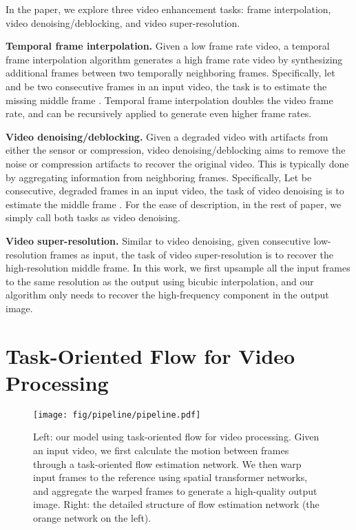 \documentclass[twocolumn,natbib]{svjour3}          \smartqed  \usepackage{graphicx}
\newcommand{\myparagraph}[1]{\vspace{5pt}\noindent\textbf{#1}}
\begin{document}
In the paper, we explore three video enhancement tasks: frame interpolation, video denoising/deblocking, and video super-resolution.

\myparagraph{Temporal frame interpolation. } Given a low frame rate video, a temporal frame interpolation algorithm generates a high frame rate video by synthesizing additional frames between two temporally neighboring frames. Specifically, let  and  be two consecutive frames in an input video, the task is to estimate the missing middle frame . Temporal frame interpolation doubles the video frame rate, and can be recursively applied to generate even higher frame rates. 

\myparagraph{Video denoising/deblocking. } Given a degraded video with artifacts from either the sensor or compression, video denoising/deblocking aims to remove the noise or compression artifacts to recover the original video. This is typically done by aggregating information from neighboring frames. Specifically, Let  be  consecutive, degraded frames in an input video, the task of video denoising is to estimate the middle frame . For the ease of description, in the rest of paper, we simply call both tasks as video denoising. 

\myparagraph{Video super-resolution. } Similar to video denoising, given  consecutive low-resolution frames as input, the task of video super-resolution is to recover the high-resolution middle frame. In this work, we first upsample all the input frames to the same resolution as the output using bicubic interpolation, and our algorithm only needs to recover the high-frequency component in the output image.
 \section{Task-Oriented Flow for Video Processing}
\label{sect:model}


\begin{figure*}[t]
    \centering
    \texttt{[image: fig/pipeline/pipeline.pdf]}
    \caption{Left: our model using task-oriented flow for video processing. Given an input video, we first calculate the motion between frames through a task-oriented flow estimation network. We then warp input frames to the reference using spatial transformer networks, and aggregate the warped frames to generate a high-quality output image. Right: the detailed structure of flow estimation network (the orange network on the left).
    }
    \label{fig:pipeline}
\end{figure*}
\end{document}
